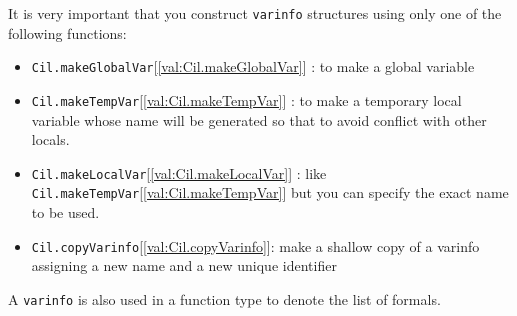 \documentclass[11pt]{article}
\begin{document}
 It is very important that you construct {\tt{varinfo}} structures using only one
 of the following functions:\begin{itemize}
\item {\tt{Cil.makeGlobalVar}}[\ref{val:Cil.makeGlobalVar}] : to make a global variable
\item {\tt{Cil.makeTempVar}}[\ref{val:Cil.makeTempVar}] : to make a temporary local variable whose name
will be generated so that to avoid conflict with other locals. 
\item {\tt{Cil.makeLocalVar}}[\ref{val:Cil.makeLocalVar}] : like {\tt{Cil.makeTempVar}}[\ref{val:Cil.makeTempVar}] but you can specify the
exact name to be used. 
\item {\tt{Cil.copyVarinfo}}[\ref{val:Cil.copyVarinfo}]: make a shallow copy of a varinfo assigning a new name 
and a new unique identifier
\end{itemize}

 A {\tt{varinfo}} is also used in a function type to denote the list of formals.
\end{document}
